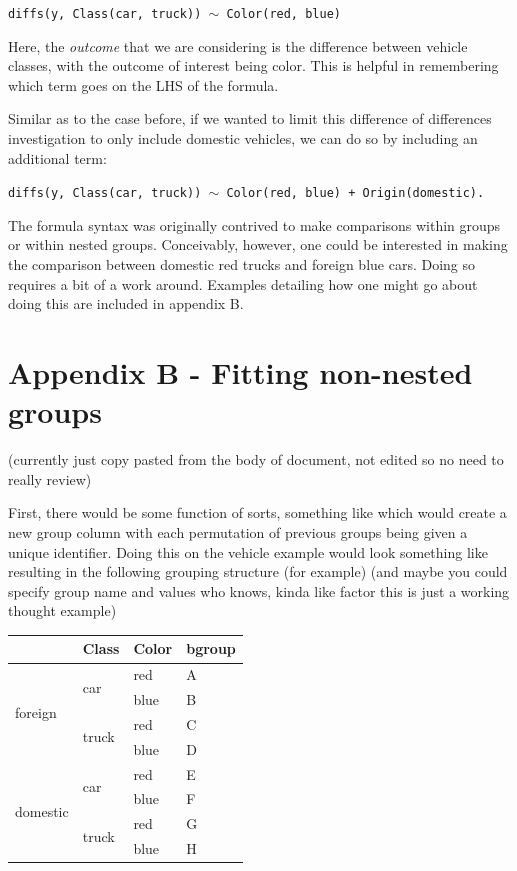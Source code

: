 \begin{center}
\tt diffs(y, Class(car, truck)) $\sim$ Color(red, blue)
\end{center}

Here, the \textit{outcome} that we are considering is the difference between vehicle classes, with the outcome of interest being color. This is helpful in remembering which term goes on the LHS of the formula. 

Similar as to the case before, if we wanted to limit this difference of differences investigation to only include domestic vehicles, we can do so by including an additional term:

\begin{center}
\tt diffs(y, Class(car, truck)) $\sim$ Color(red, blue) + Origin(domestic).
\end{center}

The formula syntax was originally contrived to make comparisons within groups or within nested groups. Conceivably, however, one could be interested in making the comparison between domestic red trucks and foreign blue cars. Doing so requires a bit of a work around. Examples detailing how one might go about doing this are included in appendix B. 

\section*{Appendix B - Fitting non-nested groups}

(currently just copy pasted from the body of document, not edited so no need to really review)

First, there would be some function of sorts, something like  which would create a new group column with each permutation of previous groups being given a unique identifier. Doing this on the vehicle example would look something like  resulting in the following grouping structure (for example) (and maybe you could specify group name and values who knows, kinda like factor this is just a working thought example)

\begin{center}

\begin{tabular}{|p{0.9in}|p{0.9in}|p{0.9in}|p{0.5in}|} \hline 
\rowcolor{lightgray} \multicolumn{1}{|c|}{Origin} & \multicolumn{1}{c|}{Class} & \multicolumn{1}{c|}{Color} & \multicolumn{1}{c|}{bgroup}\\
\hline
\multirow{4}{*}{foreign} & \multirow{2}{*}{car} & red & A\\
\hhline{~~--}
& & blue & B \\
\hhline{~---}
& \multirow{2}{*}{truck} & red & C\\
\hhline{~~--}
& & blue & D\\
\hline
\multirow{4}{*}{domestic} & \multirow{2}{*}{car} & red & E \\
\hhline{~~--}
& & blue & F\\
\hhline{~---}
& \multirow{2}{*}{truck} & red & G\\
\hhline{~~--}
& & blue & H\\
\hline
\end{tabular}
\end{center}

